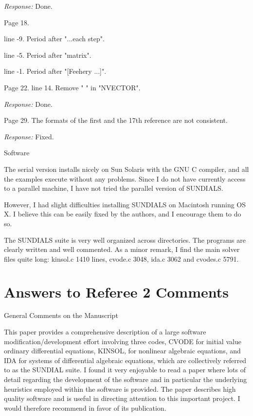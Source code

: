 \documentclass[12pt]{letter}
\begin{document}
{\em Response:} Done.

Page 18.

line -9. Period after "...each step".

line -5. Period after "matrix".

line -1. Period after "[Feehery ...]".

Page 22.
line 14. Remove " " in "NVECTOR".

{\em Response:} Done.

Page 29. The formats of the first and the 17th reference are not consistent.

{\em Response:} Fixed.

Software

The serial version installs nicely on Sun Solaris with the GNU C
compiler, and all the examples execute without any problems. Since I
do not have currently access to a parallel machine, I have not tried
the parallel version of SUNDIALS.

However, I had slight difficulties installing SUNDIALS on Macintosh
running OS X. I believe this can be easily fixed by the authors, and I
encourage them to do so.

The SUNDIALS suite is very well organized across directories. The
programs are clearly written and well commented.  As a minor remark, I
find the main solver files quite long: kinsol.c 1410 lines, cvode.c
3048, ida.c 3062 and cvodes.c 5791.


\newpage
\section{Answers to Referee 2 Comments}

General Comments on the Manuscript

This paper provides a comprehensive description of a large software
modification/development effort involving three codes, CVODE for
initial value ordinary differential equations, KINSOL, for nonlinear
algebraic equations, and IDA for systems of differential algebraic
equations, which are collectively referred to as the SUNDIAL suite. I
found it very enjoyable to read a paper where lots of detail regarding
the development of the software and in particular the underlying
heuristics employed within the software is provided. The paper
describes high quality software and is useful in directing attention
to this important project.  I would therefore recommend in favor of
its publication.
\end{document}

